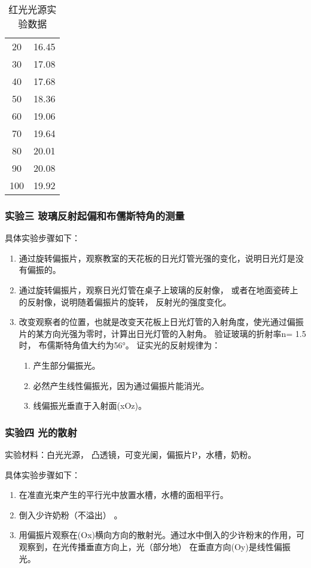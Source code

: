 \documentclass[dvipsnames, svgnames,a4paper,11pt]{article}
\begin{document}
\begin{table}[htbp]
\begin{minipage}[t]{0.3\linewidth}
\begin{tabular}{|cc|}
			20  & 16.45  \\
			30  & 17.08  \\
			40  & 17.68  \\
			50  & 18.36  \\
			60  & 19.06  \\
			70  & 19.64  \\
			80  & 20.01  \\
			90  & 20.08  \\
			100 & 19.92  \\
			\hline
			\end{tabular}
			\caption{红光光源实验数据}
		\end{minipage}
		\label{tbl:table2-1}
	\end{table}

	\subsubsection{实验三 \quad 玻璃反射起偏和布儒斯特角的测量}


	具体实验步骤如下：
	\begin{enumerate}
		\item 通过旋转偏振片，观察教室的天花板的日光灯管光强的变化，说明日光灯是没有偏振的。
		\item 通过旋转偏振片，观察日光灯管在桌子上玻璃的反射像， 或者在地面瓷砖上的反射像，说明随着偏振片的旋转， 反射光的强度变化。
		\item 改变观察者的位置，也就是改变天花板上日光灯管的入射角度，使光通过偏振片的某方向光强为零时，计算出日光灯管的入射角。 验证玻璃的折射率n= 1.5时， 布儒斯特角值大约为56°。
		证实光的反射规律为：
		\begin{enumerate}[label=\roman*.]
			\item 产生部分偏振光。
			\item 必然产生线性偏振光，因为通过偏振片能消光。
			\item 线偏振光垂直于入射面(xOz)。
		\end{enumerate}
	\end{enumerate}




	\subsubsection{实验四 \quad 光的散射}

	实验材料：白光光源， 凸透镜，可变光阑，偏振片P，水槽，奶粉。

	具体实验步骤如下：
	\begin{enumerate}
		\item 在准直光束产生的平行光中放置水槽，水槽的面相平行。
		\item 倒入少许奶粉（不溢出） 。
		\item 用偏振片观察在(Ox)横向方向的散射光。通过水中倒入的少许粉末的作用，可观察到，在光传播垂直方向上，光（部分地） 在垂直方向(Oy)是线性偏振光。
	\end{enumerate}
\end{document}
